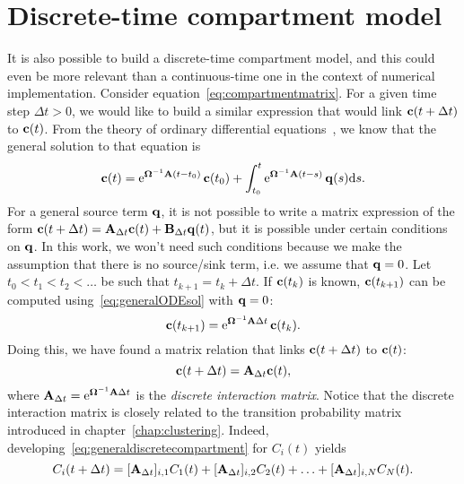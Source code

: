 \section{Discrete-time compartment model} \label{sec:dtcm(chapcomp)}
It is also possible to build a discrete-time compartment model, and this could even be more relevant than a continuous-time one in the context of numerical implementation. Consider equation~\eqref{eq:compartmentmatrix}. For a given time step $\Delta t > 0$, we would like to build a similar expression that would link $\mathbf c(t+\Delta t)$ to $\mathbf c(t)$. From the theory of ordinary differential equations~\cite{EDO}, we know that the general solution to that equation is
\begin{equation} \label{eq:generalODEsol}
	\mathbf c(t) = \operatorname{e}^{\boldsymbol \Omega^{-1}\mathbf A(t-t_0)} \mathbf c(t_0) + \int_{t_0}^t \operatorname{e}^{\boldsymbol \Omega^{-1}\mathbf A(t-s)} \mathbf q(s) \mathrm ds.
\end{equation}
For a general source term $\mathbf q$, it is not possible to write a matrix expression of the form $\mathbf c(t+\Delta t) = \mathbf A_{\Delta t} \mathbf c(t) + \mathbf B_{\Delta t} \mathbf q(t)$, but it is possible under certain conditions on $\mathbf q$. In this work, we won't need such conditions because we make the assumption that there is no source/sink term, i.e. we assume that $\mathbf q = 0$. Let $t_0 < t_1 < t_2 < \dots$ be such that $t_{k+1} = t_k + \Delta t$. If $\mathbf c(t_k)$ is known, $\mathbf c(t_{k+1})$ can be computed using~\eqref{eq:generalODEsol} with $\mathbf q = 0$:
\begin{equation}
	\mathbf c(t_{k+1}) = \operatorname{e}^{\boldsymbol \Omega^{-1}\mathbf A\Delta t} \mathbf c(t_k).
\end{equation}
Doing this, we have found a matrix relation that links $\mathbf c(t+\Delta t)$ to $\mathbf c(t)$:
\begin{equation} \label{eq:generaldiscretecompartment}
	\mathbf c(t + \Delta t) = \mathbf A_{\Delta t} \mathbf c(t),
\end{equation}
where $\mathbf A_{\Delta t} = \operatorname{e}^{\boldsymbol \Omega^{-1}\mathbf A\Delta t}$ is the \textit{discrete interaction matrix}. Notice that the discrete interaction matrix is closely related to the transition probability matrix introduced in chapter~\ref{chap:clustering}. Indeed, developing~\eqref{eq:generaldiscretecompartment} for $C_i(t)$ yields
\begin{equation} \label{eq:crapaud}
	C_i(t+\Delta t) = [\mathbf A_{\Delta t}]_{i,1} C_{1}(t) + [\mathbf A_{\Delta t}]_{i,2} C_{2}(t) + \ldots + [\mathbf A_{\Delta t}]_{i,N} C_{N}(t).  	
\end{equation}
